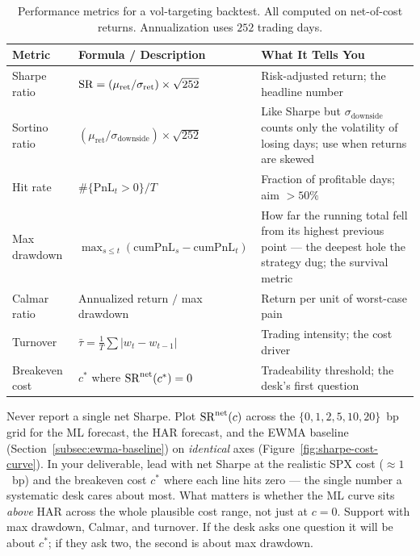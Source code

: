 \begin{table}[htbp]
\centering
\caption{Performance metrics for a vol-targeting backtest. All computed on net-of-cost returns. Annualization uses $252$ trading days.}
\label{tab:perf-metrics}
\begin{tabular}{p{2.9cm} p{6.3cm} p{4.0cm}}
\toprule
\textbf{Metric} & \textbf{Formula / Description} & \textbf{What It Tells You} \\
\midrule
Sharpe ratio & $\operatorname{SR} = (\mu_{\text{ret}} / \sigma_{\text{ret}}) \times \sqrt{252}$ & Risk-adjusted return; the headline number \\
\addlinespace
Sortino ratio & $(\mu_{\text{ret}} / \sigma_{\text{downside}}) \times \sqrt{252}$ & Like Sharpe but $\sigma_{\text{downside}}$ counts only the volatility of losing days; use when returns are skewed \\
\addlinespace
Hit rate & $\#\{\text{PnL}_t > 0\} / T$ & Fraction of profitable days; aim $> 50\%$ \\
\addlinespace
Max drawdown & $\max_{s \le t}(\text{cumPnL}_s - \text{cumPnL}_t)$ & How far the running total fell from its highest previous point --- the deepest hole the strategy dug; the survival metric \\
\addlinespace
Calmar ratio & Annualized return $/$ max drawdown & Return per unit of worst-case pain \\
\addlinespace
Turnover & $\bar\tau = \tfrac{1}{T}\sum |w_t - w_{t-1}|$ & Trading intensity; the cost driver \\
\addlinespace
Breakeven cost & $c^\ast$ where $\operatorname{SR}^{\text{net}}(c^\ast) = 0$ & Tradeability threshold; the desk's first question \\
\bottomrule
\end{tabular}
\end{table}

\begin{keyidea}
Never report a single net Sharpe. Plot $\operatorname{SR}^{\text{net}}(c)$ across the $\{0, 1, 2, 5, 10, 20\}$~bp grid for the ML forecast, the HAR forecast, and the EWMA baseline (Section~\ref{subsec:ewma-baseline}) on \emph{identical} axes (Figure~\ref{fig:sharpe-cost-curve}). In your deliverable, lead with net Sharpe at the realistic SPX cost ($\approx 1$~bp) and the breakeven cost $c^\ast$ where each line hits zero --- the single number a systematic desk cares about most. What matters is whether the ML curve sits \emph{above} HAR across the whole plausible cost range, not just at $c = 0$. Support with max drawdown, Calmar, and turnover. If the desk asks one question it will be about $c^\ast$; if they ask two, the second is about max drawdown.
\end{keyidea}

